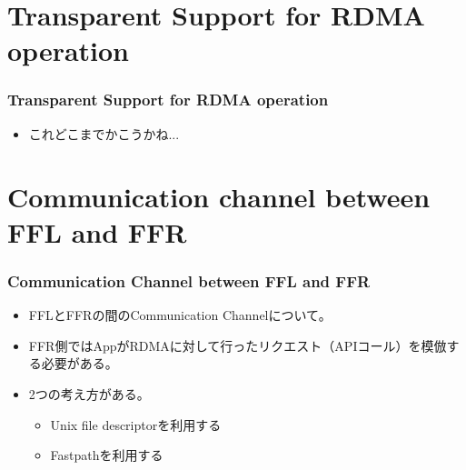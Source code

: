 \documentclass[dvipdfmx,9pt,notheorems]{beamer}
\theoremstyle{definition}
\begin{document}
\section{Transparent Support for RDMA operation}
\begin{frame}\frametitle{Transparent Support for RDMA operation}
	\begin{itemize}
		\item これどこまでかこうかね...
	\end{itemize}
\end{frame}

\section{Communication channel between FFL and FFR}
\begin{frame}\frametitle{Communication Channel between FFL and FFR}
	\begin{itemize}
		\item FFLとFFRの間のCommunication Channelについて。
		\item FFR側ではAppがRDMAに対して行ったリクエスト（APIコール）を模倣する必要がある。
		\item 2つの考え方がある。
		\begin{itemize}
			\item Unix file descriptorを利用する
			\item Fastpathを利用する
		\end{itemize}
	\end{itemize}
\end{frame}
\end{document}
